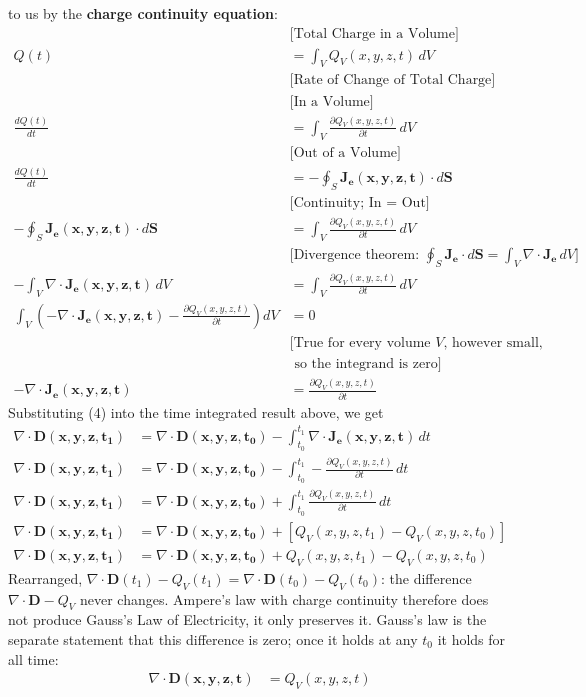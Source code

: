 to us by the \textbf{charge continuity equation}:
\begin{align*}
  & \text{[Total Charge in a Volume]} \\
  Q(t) &= \int_V Q_V(x,y,z,t) \, dV \\
  & \text{[Rate of Change of Total Charge]} \\
  & \text{[In a Volume]} \\
  \frac{dQ(t)}{dt} &= \int_V \frac{\partial Q_V(x,y,z,t)}{\partial t} \, dV \\
  & \text{[Out of a Volume]} \\
  \frac{dQ(t)}{dt} &= - \oint_S \mathbf{J_e(x,y,z,t)} \cdot d\mathbf{S} \\
  & \text{[Continuity; In = Out]} \\
  - \oint_S \mathbf{J_e(x,y,z,t)} \cdot d\mathbf{S} &= \int_V \frac{\partial Q_V(x,y,z,t)}{\partial t} \, dV \\
  & \text{[Divergence theorem: } \oint_S \mathbf{J_e} \cdot d\mathbf{S} = \int_V \nabla \cdot \mathbf{J_e} \, dV\text{]} \\
  - \int_V \nabla \cdot \mathbf{J_e(x,y,z,t)} \, dV &= \int_V \frac{\partial Q_V(x,y,z,t)}{\partial t} \, dV \\
  \int_V \left(- \nabla \cdot \mathbf{J_e(x,y,z,t)} - \frac{\partial Q_V(x,y,z,t)}{\partial t}\right) dV &= 0 \\
  & \text{[True for every volume \(V\), however small,} \\
  & \text{\ so the integrand is zero]} \\
  - \nabla \cdot \mathbf{J_e(x,y,z,t)} &= \frac{\partial Q_V(x,y,z,t)}{\partial t} \tag{4}
\end{align*}
Substituting (4) into the time integrated result above, we get
\begin{align*}
  \nabla \cdot \mathbf{D(x,y,z,t_1)} &= \nabla \cdot \mathbf{D(x,y,z,t_0)} - \int_{t_0}^{t_1} \nabla \cdot \mathbf{J_e(x,y,z,t)} \, dt \\
  \nabla \cdot \mathbf{D(x,y,z,t_1)} &= \nabla \cdot \mathbf{D(x,y,z,t_0)} - \int_{t_0}^{t_1} - \frac{\partial Q_V(x,y,z,t)}{\partial t} \, dt \\
  \nabla \cdot \mathbf{D(x,y,z,t_1)} &= \nabla \cdot \mathbf{D(x,y,z,t_0)} + \int_{t_0}^{t_1} \frac{\partial Q_V(x,y,z,t)}{\partial t} \, dt \\
  \nabla \cdot \mathbf{D(x,y,z,t_1)} &= \nabla \cdot \mathbf{D(x,y,z,t_0)} + [Q_V(x,y,z,t_1) - Q_V(x,y,z,t_0)] \\
  \nabla \cdot \mathbf{D(x,y,z,t_1)} &= \nabla \cdot \mathbf{D(x,y,z,t_0)} + Q_V(x,y,z,t_1) - Q_V(x,y,z,t_0)
\end{align*}
Rearranged, \(\nabla \cdot \mathbf{D}(t_1) - Q_V(t_1) = \nabla \cdot \mathbf{D}(t_0) - Q_V(t_0)\): the
difference \(\nabla \cdot \mathbf{D} - Q_V\) never changes. Ampere's law with charge
continuity therefore does not produce Gauss's Law of Electricity, it only
preserves it. Gauss's law is the separate statement that this difference is
zero; once it holds at any \(t_0\) it holds for all time:
\begin{align*}
  \nabla \cdot \mathbf{D(x,y,z,t)} &= Q_V(x,y,z,t) \tag{3a}
\end{align*}

